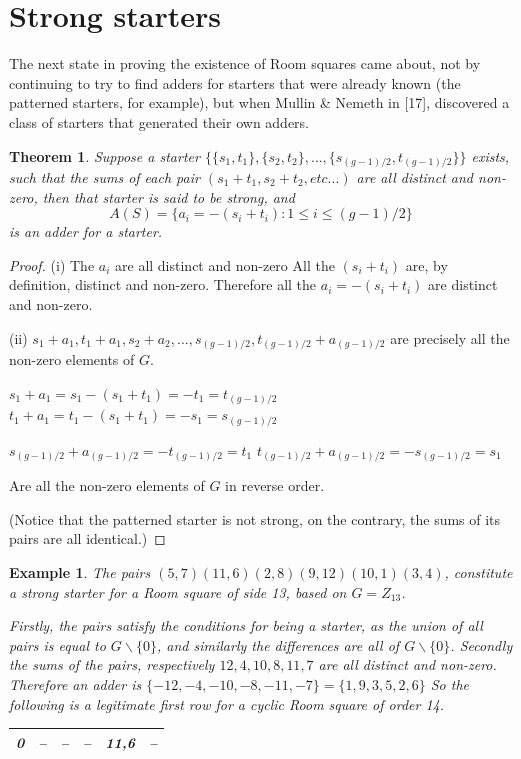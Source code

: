 \documentclass[
  11pt,
  a4paper]{book}
\newtheorem{theorem}{Theorem}
\newtheorem{example}{Example}
\begin{document}
\hypertarget{strong-starters}{%
\section{Strong starters}\label{strong-starters}}

The next state in proving the existence of Room squares came
about, not by continuing to try to find adders for starters
that were already known (the patterned starters, for
example), but when Mullin \& Nemeth in {[}17{]}, discovered a
class of starters that generated their own adders.

\begin{theorem}
Suppose a starter
$\{\{s_1, t_1\}, \{s_2, t_2\}, \ldots, \{s_{(g  -1)/2}, t_{(g - 1)/2}\}\}$
exists, such that the sums of each pair
$(s_1 + t_1, s_2 + t_2, etc...)$
are all distinct and non-zero, then that starter is said
to be strong, and
$$A(S) = \{a_i = -(s_i + t_i):1 \leq i \leq (g-1)/2\}$$
is an adder for a starter.
\end{theorem}

\begin{proof}
  (i) The $a_i$ are all distinct and non-zero
      All the $(s_i + t_i)$ are, by definition, distinct
      and non-zero. Therefore all the $a_i = -(s_i + t_i)$ are
      distinct and non-zero.

  (ii) $s_1 + a_1, t_1 + a_1, s_2 + a_2, \ldots, s_{(g - 1)/2}, t_{(g - 1)/2} + a_{(g - 1)/2}$
      are precisely all the non-zero elements of $G$.

      $s_1 + a_1 = s_1 - (s_1 + t_1) = -t_1 = t_{(g - 1)/2}$
      $t_1 + a_1 = t_1 - (s_1 + t_1) = -s_1 = s_{(g - 1)/2}$
      
      $s_{(g - 1)/2} + a_{(g - 1)/2} = -t_{(g - 1)/2} = t_1$
      $t_{(g - 1)/2} + a_{(g - 1)/2} = -s_{(g - 1)/2} = s_1$

      Are all the non-zero elements of $G$ in reverse order.

(Notice that the patterned starter is not strong, on the
contrary, the sums of its pairs are all identical.)
\end{proof}

\begin{example}
The pairs $(5, 7)(11, 6)(2, 8)(9, 12)(10, 1)(3, 4)$,
constitute a strong starter for a Room square of side 13,
based on $G = Z_{13}$.

Firstly, the pairs satisfy the conditions for being a
starter, as the union of all pairs is equal to
$G \backslash \{0\}$, and similarly the differences are all of
$G\backslash \{0\}$.
Secondly the sums of the pairs,
respectively $12, 4, 10, 8, 11, 7$ are all distinct and
non-zero.
Therefore an adder is
$\{-12, -4, -10, -8, -11, -7\} = \{1, 9, 3, 5, 2, 6\}$
So the following is a legitimate first row for a cyclic
Room square of order 14.


\begin{tabular}{l|l|l|l|l|l}
\hline
0 & -- & -- & -- & 11,6 & --\\


\hline
\end{tabular}

\end{example}
\end{document}
